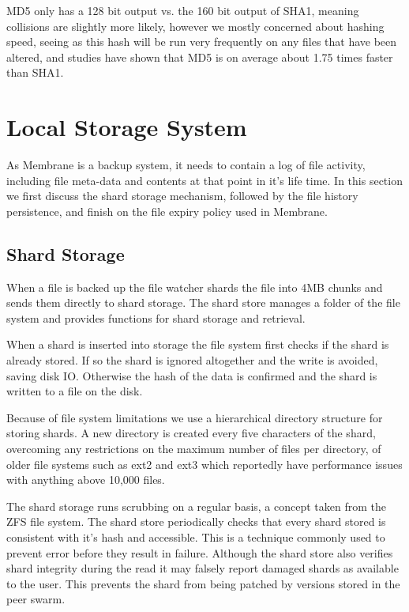 \documentclass[11pt, a4paper, twocolumn, twoside]{report}
\begin{document}
MD5 only has a 128 bit output vs. the 160 bit output of SHA1, meaning collisions are slightly more likely, however we mostly concerned about hashing speed, seeing as this hash will be run very frequently on any files that have been altered, and studies have shown that MD5 is on average about 1.75 times faster than SHA1. \citep{saphir2007securite}

\section{Local Storage System}

As Membrane is a backup system, it needs to contain a log of file activity, including file meta-data and contents at that point in it's life time. In this section we first discuss the shard storage mechanism, followed by the file history persistence, and finish on the file expiry policy used in Membrane.

\subsection{Shard Storage}

When a file is backed up the file watcher shards the file into 4MB chunks and sends them directly to shard storage. The shard store manages a folder of the file system and provides functions for shard storage and retrieval.

When a shard is inserted into storage the file system first checks if the shard is already stored. If so the shard is ignored altogether and the write is avoided, saving disk IO. Otherwise the hash of the data is confirmed and the shard is written to a file on the disk.

Because of file system limitations we use a hierarchical directory structure for storing shards. A new directory is created every five characters of the shard, overcoming any restrictions on the maximum number of files per directory, of older file systems such as ext2 and ext3 which reportedly have performance issues with anything above 10,000 files. \citep{johnson2014files}

The shard storage runs scrubbing on a regular basis, a concept taken from the ZFS file system. \citep{oracle2012zfs} The shard store periodically checks that every shard stored is consistent with it's hash and accessible. This is a technique commonly used to prevent error before they result in failure. Although the shard store also verifies shard integrity during the read it may falsely report damaged shards as available to the user. This prevents the shard from being patched by versions stored in the peer swarm.
\end{document}
